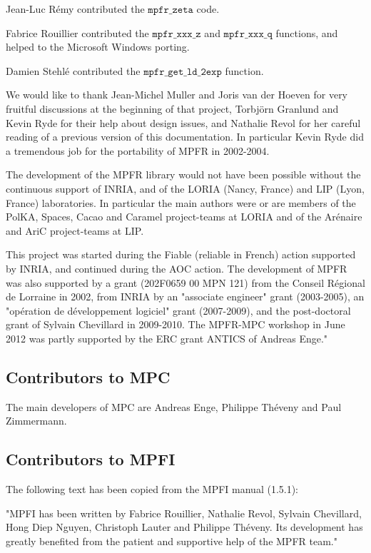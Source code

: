 \vpara
Jean-Luc R\'emy contributed the $\mathtt{mpfr\_zeta}$ code.

\vpara
Fabrice Rouillier contributed the $\mathtt{mpfr\_xxx\_z}$ and $\mathtt{mpfr\_xxx\_q}$
functions, and helped to the Microsoft Windows porting.

\vpara
Damien Stehl\'e contributed the $\mathtt{mpfr\_get\_ld\_2exp}$ function.

\vpara
We would like to thank Jean-Michel Muller and Joris van der Hoeven for very
fruitful discussions at the beginning of that project, Torbj\"orn Granlund
and Kevin Ryde for their help about design issues,
and Nathalie Revol for her careful reading of a previous version of
this documentation. In particular
Kevin Ryde did a tremendous job for the portability of MPFR in 2002-2004.

\vpara
The development of the MPFR library would not have been possible without
the continuous support of INRIA, and of the LORIA (Nancy, France) and LIP
(Lyon, France) laboratories. In particular the main authors were or are
members of the PolKA, Spaces, Cacao and Caramel
project-teams at LORIA and of the
Ar\'enaire and AriC project-teams at LIP.

This project was started during the Fiable (reliable in French) action
supported by INRIA, and continued during the AOC action.
The development of MPFR was also supported by a grant
(202F0659 00 MPN 121) from the Conseil R\'egional de Lorraine in 2002,
from INRIA by an "associate engineer" grant (2003-2005),
an "op\'eration de d\'eveloppement logiciel" grant (2007-2009),
and the post-doctoral grant of Sylvain Chevillard in 2009-2010.
The MPFR-MPC workshop in June 2012 was partly supported by the ERC
grant ANTICS of Andreas Enge."




\subsection{Contributors to MPC}
\label{Contributors to MPC}
The main developers of MPC are Andreas Enge, Philippe Th\'eveny and Paul Zimmermann.



\subsection{Contributors to MPFI}
\label{Contributors to MPFI}
The following text has been copied from the MPFI manual (1.5.1):

\vpara
"MPFI has been written by Fabrice Rouillier, Nathalie Revol, Sylvain Chevillard, Hong Diep
Nguyen, Christoph Lauter and Philippe Th\'eveny. Its development has greatly benefited from
the patient and supportive help of the MPFR team."



